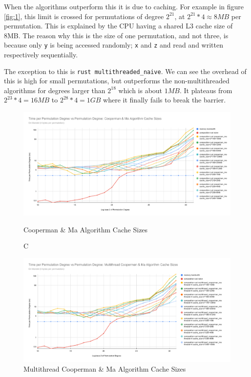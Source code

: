 \documentclass{article}
\begin{document}
When the algorithms outperform this it is due to caching. For example in figure \ref{fig:1}, this limit is crossed for permutations of degree $2^{21}$, at $2^{21}*4\approx8MB$ per permutation. This is explained by the CPU having a shared L3 cache size of 8MB\cite{ark}. The reason why this is the size of one permutation, and not three, is because only \verb|y| is being accessed randomly; \verb|x| and \verb|z| and read and written respectively sequentially. 

The exception to this is \verb|rust multithreaded_naive|. We can see the overhead of this is high for small permutations, but outperforms the non-multithreaded algorithms for degrees larger than $2^{18}$ which is about $1MB$. It plateaus from $2^{23}*4=16MB$ to $2^{28}*4=1GB$ where it finally fails to break the barrier.

\begin{figure}[h]
    \centerline{
        \includegraphics[width=0.9\paperwidth,height=\textheight,keepaspectratio]
        {Time per Permutation Degree vs Permutation Degree_ Cooperman & Ma Algorithm Cache Sizes_mandel.pdf}
    }
    \caption{Cooperman \& Ma Algorithm Cache Sizes}
    \caption{ C}
    \label{fig:2}
\end{figure}

\begin{figure}[h]
    \centerline{
        \includegraphics[width=0.9\paperwidth,height=\textheight,keepaspectratio]
        {Time per Permutation Degree vs Permutation Degree_ Multithread Cooperman & Ma Algorithm Cache Sizes_mandel.pdf}
    }
    \caption{Multithread Cooperman \& Ma Algorithm Cache Sizes}
    \label{fig:3}
\end{figure}
\end{document}
